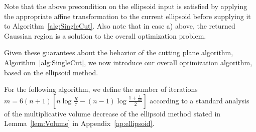 \documentclass[11pt,letter]{article}
\numberwithin{nTheorems}{section}
\begin{document}
Note that the above precondition on the ellipsoid input is satisfied by applying the appropriate affine transformation to the current ellipsoid before supplying it to Algorithm~\ref{alg:SingleCut}.
Also note that in case a) above, the returned Gaussian region is a solution to the overall optimization problem.


Given these guarantees about the behavior of the cutting plane algorithm, Algorithm~\ref{alg:SingleCut}, we now introduce our overall optimization algorithm, based on the ellipsoid method.

For the following algorithm, we define the number of iterations $m = 6(n+1)\left[n\log\frac{R}{\tau} - (n-1)\log\frac{1+\frac{1}{3n}}{2}\right]$ according to a standard analysis of the multiplicative volume decrease of the ellipsoid method stated in Lemma~\ref{lem:Volume} in Appendix~\ref{ap:ellipsoid}.
\end{document}
